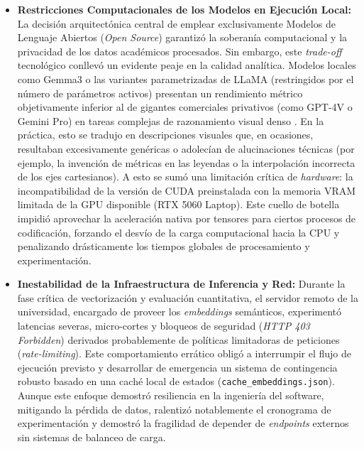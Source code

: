 \documentclass[a4paper]{report}
\begin{document}
\begin{itemize}
    \item \textbf{Restricciones Computacionales de los Modelos en Ejecución Local:} La decisión arquitectónica central de emplear exclusivamente Modelos de Lenguaje Abiertos (\textit{Open Source}) garantizó la soberanía computacional y la privacidad de los datos académicos procesados. Sin embargo, este \textit{trade-off} tecnológico conllevó un evidente peaje en la calidad analítica. Modelos locales como Gemma3 o las variantes parametrizadas de LLaMA (restringidos por el número de parámetros activos) presentan un rendimiento métrico objetivamente inferior al de gigantes comerciales privativos (como GPT-4V o Gemini Pro) en tareas complejas de razonamiento visual denso \cite{yin2023}. En la práctica, esto se tradujo en descripciones visuales que, en ocasiones, resultaban excesivamente genéricas o adolecían de alucinaciones técnicas (por ejemplo, la invención de métricas en las leyendas o la interpolación incorrecta de los ejes cartesianos). A esto se sumó una limitación crítica de \textit{hardware}: la incompatibilidad de la versión de CUDA preinstalada con la memoria VRAM limitada de la GPU disponible (RTX 5060 Laptop). Este cuello de botella impidió aprovechar la aceleración nativa por tensores para ciertos procesos de codificación, forzando el desvío de la carga computacional hacia la CPU y penalizando drásticamente los tiempos globales de procesamiento y experimentación.

    \item \textbf{Inestabilidad de la Infraestructura de Inferencia y Red:} Durante la fase crítica de vectorización y evaluación cuantitativa, el servidor remoto de la universidad, encargado de proveer los \textit{embeddings} semánticos, experimentó latencias severas, micro-cortes y bloqueos de seguridad (\textit{HTTP 403 Forbidden}) derivados probablemente de políticas limitadoras de peticiones (\textit{rate-limiting}). Este comportamiento errático obligó a interrumpir el flujo de ejecución previsto y desarrollar de emergencia un sistema de contingencia robusto basado en una caché local de estados (\texttt{cache\_embeddings.json}). Aunque este enfoque demostró resiliencia en la ingeniería del software, mitigando la pérdida de datos, ralentizó notablemente el cronograma de experimentación y demostró la fragilidad de depender de \textit{endpoints} externos sin sistemas de balanceo de carga.


\end{itemize}
\end{document}
